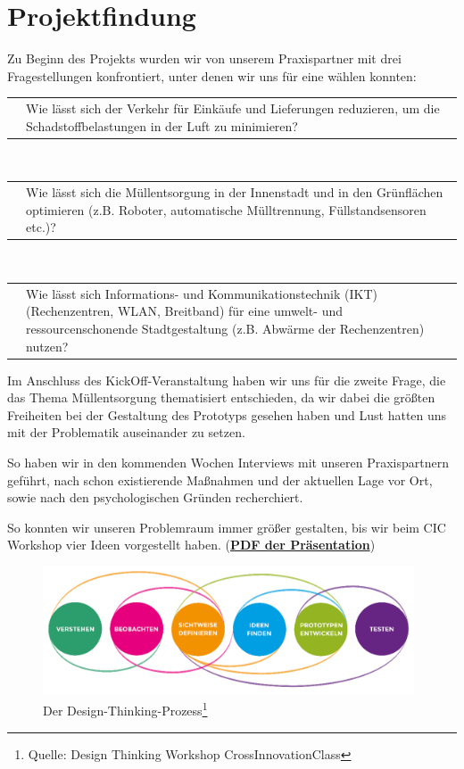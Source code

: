 \chapter{Projektfindung}\label{chp:projektfindung}

    Zu Beginn des Projekts wurden wir von unserem Praxispartner mit drei Fragestellungen konfrontiert, unter denen wir uns für eine wählen konnten:

    \vspace{1em}
    \begin{tabular}{ l|p{13.5cm} }
        \quad & Wie lässt sich der Verkehr für Einkäufe und Lieferungen reduzieren, um die Schadstoffbelastungen in der Luft zu minimieren?
    \end{tabular}
    \\[1em]
    \begin{tabular}{ l|p{13.5cm} }
        \quad & Wie lässt sich die Müllentsorgung in der Innenstadt und in den Grünflächen optimieren (z.B. Roboter, automatische Mülltrennung, Füllstandsensoren etc.)?
    \end{tabular}
    \\[1em]
    \begin{tabular}{ l|p{13.5cm} }
        \quad & Wie lässt sich Informations- und Kommunikationstechnik (IKT) (Rechenzentren, WLAN, Breitband) für eine umwelt- und ressourcenschonende Stadtgestaltung (z.B. Abwärme der Rechenzentren) nutzen? 
    \end{tabular}
    \vspace{1em}

    Im Anschluss des KickOff-Veranstaltung haben wir uns für die zweite Frage, die das Thema Müllentsorgung thematisiert entschieden, da wir dabei die größten Freiheiten bei der Gestaltung des Prototyps gesehen haben und Lust hatten uns mit der Problematik auseinander zu setzen.

    So haben wir in den kommenden Wochen Interviews mit unseren Praxispartnern geführt, nach schon existierende Maßnahmen und der aktuellen Lage vor Ort, sowie nach den psychologischen Gründen recherchiert.
    
    So konnten wir unseren Problemraum immer größer gestalten, bis wir beim CIC Workshop vier Ideen vorgestellt haben. (\href{run:attachments/Frankfurt_Ideen_CIC.pdf}{\textbf{PDF der Präsentation}})

    \begin{figure}[h]
        \begin{center}
            \includegraphics[width=11cm]{media/00_introduction/design_thinking_2.png}
        \end{center}
        \caption{Der Design-Thinking-Prozess\protect\footnote{Quelle: Design Thinking Workshop CrossInnovationClass}}
        \label{fig:dt_2}
    \end{figure}

